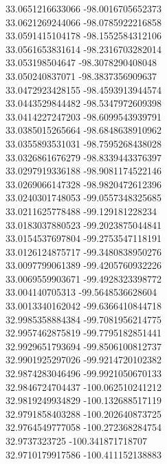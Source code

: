 {33.0651216633066	-98.0016705652373\\
33.0621269244066	-98.0785922216858\\
33.0591415104178	-98.1552584312106\\
33.0561653831614	-98.2316703282014\\
33.053198504647	-98.3078290408048\\
33.050240837071	-98.3837356909637\\
33.0472923428155	-98.4593913944574\\
33.0443529844482	-98.5347972609398\\
33.0414227247203	-98.6099543939791\\
33.0385015265664	-98.6848638910962\\
33.0355893531031	-98.7595268438028\\
33.0326861676279	-98.8339443376397\\
33.0297919336188	-98.9081174522146\\
33.0269066147328	-98.9820472612396\\
33.0240301748053	-99.0557348325685\\
33.0211625778488	-99.129181228234\\
33.0183037880523	-99.2023875044841\\
33.0154537697804	-99.2753547118191\\
33.0126124875717	-99.3480838950276\\
33.0097799061389	-99.4205760932226\\
33.0069559903671	-99.4928323398772\\
33.004140705313	-99.5648536628604\\
33.0013340162042	-99.6366410844718\\
32.9985358884384	-99.7081956214775\\
32.9957462875819	-99.7795182851441\\
32.9929651793694	-99.8506100812737\\
32.9901925297026	-99.9214720102382\\
32.9874283046496	-99.9921050670133\\
32.9846724704437	-100.062510241212\\
32.9819249934829	-100.132688517119\\
32.9791858403288	-100.202640873725\\
32.9764549777058	-100.272368284754\\
32.9737323725	-100.341871718707\\
32.9710179917586	-100.411152138883\\
}
